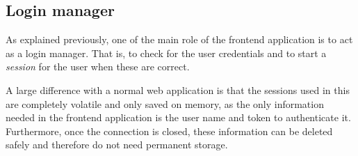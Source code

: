 \subsection{Login manager}
As explained previously, one of the main role of the frontend application is to act 
as a login manager. That is, to check for the user credentials and to start a 
\emph{session} for the user when these are correct.

A large difference with a normal web application is that the sessions used 
in this are completely volatile and only saved on memory, as the only 
information needed in the frontend application is the user name and token to 
authenticate it. Furthermore, once the connection is closed, these information 
can be deleted safely and therefore do not need permanent storage.


